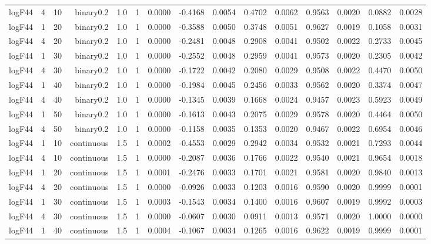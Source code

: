 \begin{longtable}{rrrrrrrrrrrrrrr}
  logF44 & 4 & 10 & binary0.2 & 1.0 & 1 & 0.0000 & -0.4168 & 0.0054 & 0.4702 & 0.0062 & 0.9563 & 0.0020 & 0.0882 & 0.0028 \\ 
  logF44 & 1 & 20 & binary0.2 & 1.0 & 1 & 0.0000 & -0.3588 & 0.0050 & 0.3748 & 0.0051 & 0.9627 & 0.0019 & 0.1058 & 0.0031 \\ 
  logF44 & 4 & 20 & binary0.2 & 1.0 & 1 & 0.0000 & -0.2481 & 0.0048 & 0.2908 & 0.0041 & 0.9502 & 0.0022 & 0.2733 & 0.0045 \\ 
  logF44 & 1 & 30 & binary0.2 & 1.0 & 1 & 0.0000 & -0.2552 & 0.0048 & 0.2959 & 0.0041 & 0.9573 & 0.0020 & 0.2305 & 0.0042 \\ 
  logF44 & 4 & 30 & binary0.2 & 1.0 & 1 & 0.0000 & -0.1722 & 0.0042 & 0.2080 & 0.0029 & 0.9508 & 0.0022 & 0.4470 & 0.0050 \\ 
  logF44 & 1 & 40 & binary0.2 & 1.0 & 1 & 0.0000 & -0.1984 & 0.0045 & 0.2456 & 0.0033 & 0.9562 & 0.0020 & 0.3374 & 0.0047 \\ 
  logF44 & 4 & 40 & binary0.2 & 1.0 & 1 & 0.0000 & -0.1345 & 0.0039 & 0.1668 & 0.0024 & 0.9457 & 0.0023 & 0.5923 & 0.0049 \\ 
  logF44 & 1 & 50 & binary0.2 & 1.0 & 1 & 0.0000 & -0.1613 & 0.0043 & 0.2075 & 0.0029 & 0.9578 & 0.0020 & 0.4464 & 0.0050 \\ 
  logF44 & 4 & 50 & binary0.2 & 1.0 & 1 & 0.0000 & -0.1158 & 0.0035 & 0.1353 & 0.0020 & 0.9467 & 0.0022 & 0.6954 & 0.0046 \\ 
  logF44 & 1 & 10 & continuous & 1.5 & 1 & 0.0002 & -0.4553 & 0.0029 & 0.2942 & 0.0034 & 0.9532 & 0.0021 & 0.7293 & 0.0044 \\ 
  logF44 & 4 & 10 & continuous & 1.5 & 1 & 0.0000 & -0.2087 & 0.0036 & 0.1766 & 0.0022 & 0.9540 & 0.0021 & 0.9654 & 0.0018 \\ 
  logF44 & 1 & 20 & continuous & 1.5 & 1 & 0.0001 & -0.2476 & 0.0033 & 0.1701 & 0.0021 & 0.9581 & 0.0020 & 0.9840 & 0.0013 \\ 
  logF44 & 4 & 20 & continuous & 1.5 & 1 & 0.0000 & -0.0926 & 0.0033 & 0.1203 & 0.0016 & 0.9590 & 0.0020 & 0.9999 & 0.0001 \\ 
  logF44 & 1 & 30 & continuous & 1.5 & 1 & 0.0003 & -0.1543 & 0.0034 & 0.1400 & 0.0016 & 0.9607 & 0.0019 & 0.9992 & 0.0003 \\ 
  logF44 & 4 & 30 & continuous & 1.5 & 1 & 0.0000 & -0.0607 & 0.0030 & 0.0911 & 0.0013 & 0.9571 & 0.0020 & 1.0000 & 0.0000 \\ 
  logF44 & 1 & 40 & continuous & 1.5 & 1 & 0.0004 & -0.1067 & 0.0034 & 0.1265 & 0.0016 & 0.9622 & 0.0019 & 0.9999 & 0.0001 \\ 

\end{longtable}
